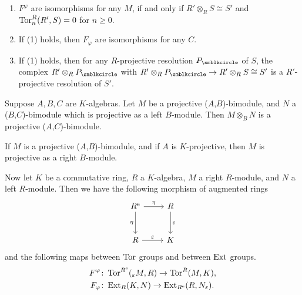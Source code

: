 \begin{theorem}\hspace*{\fill}
  \begin{enumerate}
    \item $F^\varphi$ are isomorphisms for any $M$, if and only if $R'\otimes_RS\cong S'$ and $\operatorname{Tor}_n^{R}(R', S)=0$ for $n\geq 0$.
    \item If (1) holds, then $F_\varphi$ are isomorphisms for any $C$.
    \item If (1) holds, then for any $R$-projective resolution $P_{\CCCIR}$ of $S$, the complex $R'\otimes_R P_{\CCCIR}$ with $R'\otimes_R P_{\CCCIR}\to R'\otimes_R S\cong S'$ is a $R'$-projective resolution of $S'$.
  \end{enumerate}
\end{theorem}

\begin{lemma}
  Suppose $A, B, C$ are $K$-algebras. Let $M$ be a projective ($A$,$B$)-bimodule, and $N$ a ($B$,$C$)-bimodule which is projective as a left $B$-module. Then $M\otimes_B N$ is a projective ($A$,$C$)-bimodule.
\end{lemma}

\begin{corollary}
  If $M$ is a projective ($A$,$B$)-bimodule, and if $A$ is $K$-projective, then $M$ is projective as a right $B$-module.
\end{corollary}

Now let $K$ be a commutative ring, $R$ a $K$-algebra, $M$ a right $R$-module, and $N$ a left $R$-module. Then we have the following morphism of augmented rings
\begin{equation*}
  \begin{tikzcd}[row sep=large]
    R^{\ENV} & R\\
    R & K
    \arrow[from=1-1,]{1-2}[]{\eta}
    \arrow[from=2-1,]{2-2}[]{\varepsilon}
    \arrow[from=1-1,]{2-1}[swap,]{\eta}
    \arrow[from=1-2,]{2-2}[]{\varepsilon}
  \end{tikzcd}
\end{equation*}
and the following maps between $\operatorname{Tor}$ groups and between $\operatorname{Ext}$ groups.
\begin{equation*}
  \begin{aligned}
    F^{\varphi}\colon&\operatorname{Tor}^{R^{\textrm{e}}}({}_{\varepsilon}M, R)\to\operatorname{Tor}^{R}(M, K),\\
    F_\varphi\colon&\operatorname{Ext}_{R}(K, N)\to\operatorname{Ext}_{R^{\textrm{e}}}(R, N_{\varepsilon}).
  \end{aligned}
\end{equation*}

